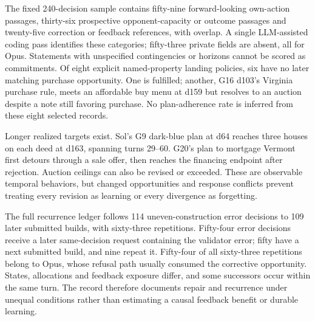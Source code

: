 The fixed 240-decision sample contains fifty-nine forward-looking own-action passages, thirty-six prospective opponent-capacity or outcome passages and twenty-five correction or feedback references, with overlap. A single LLM-assisted coding pass identifies these categories; fifty-three private fields are absent, all for Opus. Statements with unspecified contingencies or horizons cannot be scored as commitments. Of eight explicit named-property landing policies, six have no later matching purchase opportunity. One is fulfilled; another, G16 d103's Virginia purchase rule, meets an affordable buy menu at d159 but resolves to an auction despite a note still favoring purchase. No plan-adherence rate is inferred from these eight selected records.

Longer realized targets exist. Sol's G9 dark-blue plan at d64 reaches three houses on each deed at d163, spanning turns 29--60. G20's plan to mortgage Vermont first detours through a sale offer, then reaches the financing endpoint after rejection. Auction ceilings can also be revised or exceeded. These are observable temporal behaviors, but changed opportunities and response conflicts prevent treating every revision as learning or every divergence as forgetting.

The full recurrence ledger follows 114 uneven-construction error decisions to 109 later submitted builds, with sixty-three repetitions. Fifty-four error decisions receive a later same-decision request containing the validator error; fifty have a next submitted build, and nine repeat it. Fifty-four of all sixty-three repetitions belong to Opus, whose refusal path usually consumed the corrective opportunity. States, allocations and feedback exposure differ, and some successors occur within the same turn. The record therefore documents repair and recurrence under unequal conditions rather than estimating a causal feedback benefit or durable learning.
